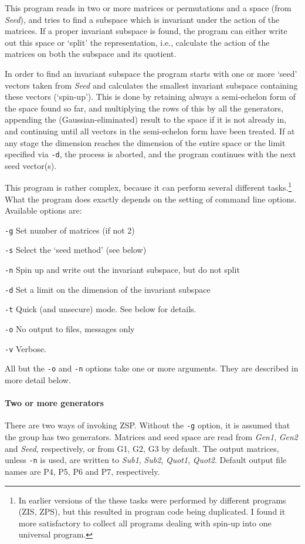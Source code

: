 \Description
This program reads in two or more matrices or permutations and a space
(from
{\it Seed}), and tries to find a subspace which is invariant under the
action of the matrices. If a proper invariant subspace is found, the
program can either write out this space or `split' the representation,
i.e., calculate the action of the matrices on both the subspace and its
quotient.

In order to find an invariant subspace the program starts with one
or more `seed' vectors taken from {\it Seed} and calculates the
smallest invariant subspace containing these vectors (`spin-up').
This is done by retaining
always a semi-echelon form of the space found so far, and multiplying
the rows of this by all the generators, appending the
(Gaussian-eliminated) result to the space if it is not already in, and
continuing until all vectors in the semi-echelon form have been
treated. If at any stage the dimension reaches the dimension of the
entire space or the limit specified via {\tt -d}, the
process is aborted, and the program continues with the next seed
vector(s).

This program is rather complex, because it can perform several
different tasks.\footnote{In earlier versions of the {\MeatAxe} these
tasks were performed by different programs (ZIS, ZPS), but this
resulted in program code being duplicated. I found it more
satisfactory to collect all programs dealing with spin-up into
one universal program.}
What the program does exactly depends on the setting of command
line options. Available options are:
\begin{list}{}{ \leftmargin 10mm 
\parsep 0mm\itemsep 0mm}
\item[{\tt -g}]	Set number of matrices (if not 2)
\item[{\tt -s}]	Select the `seed method' (see below)
\item[{\tt -n}] Spin up and write out the invariant subspace, but
	do not split
\item[{\tt -d}]	Set a limit on the dimension of the invariant subspace
\item[{\tt -t}]	Quick (and unsecure) mode. See below for details.
\item[{\tt -o}]	No output to files, messages only
\item[{\tt -v}]	Verbose.
\end{list}
All but the {\tt -o} and {\tt -n} options take one or more arguments.
They are described in more detail below.

\paragraph{Two or more generators}
There are two ways of invoking ZSP. Without the {\tt -g} option, it is
assumed that the group has two generators. Matrices and seed space are
read from {\it Gen1}, {\it Gen2} and {\em Seed}, respectively, or from
G1, G2, G3 by default. The output matrices, unless {\tt -n} is used, are
written to {\it Sub1}, {\it Sub2}, {\it Quot1}, {\it Quot2}. Default
output file names are P4, P5, P6 and P7, respectively.

